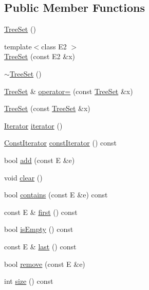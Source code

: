\subsection*{Public Member Functions}
\begin{DoxyCompactItemize}
\item 
\hyperlink{class_tree_set_a63b26923cbe71d1d8510122122db3d1a}{TreeSet} ()
\item 
{\footnotesize template$<$class E2 $>$ }\\\hyperlink{class_tree_set_ac4f90bbe6be9124628602a8051cc1bf7}{TreeSet} (const E2 \&x)
\item 
\hyperlink{class_tree_set_adfb73164a45aaf261ce5417ff43133de}{$\sim$TreeSet} ()
\item 
\hyperlink{class_tree_set}{TreeSet} \& \hyperlink{class_tree_set_a62c2c924979ed32bb18fad84f951ac92}{operator=} (const \hyperlink{class_tree_set}{TreeSet} \&x)
\item 
\hyperlink{class_tree_set_a1cb7531ae5e2e1258d7ee1bdc8e17059}{TreeSet} (const \hyperlink{class_tree_set}{TreeSet} \&x)
\item 
\hyperlink{class_tree_set_1_1_iterator}{Iterator} \hyperlink{class_tree_set_a4b22eab02d8d0600c305c29d63f3f7b8}{iterator} ()
\item 
\hyperlink{class_tree_set_1_1_const_iterator}{ConstIterator} \hyperlink{class_tree_set_a058de9aabb37e4263cc015365cadfc32}{constIterator} () const 
\item 
bool \hyperlink{class_tree_set_a3f311b68d64e3f630ef80eeca5dead7b}{add} (const E \&e)
\item 
void \hyperlink{class_tree_set_ae7b265d0ef49ecdfb4da1cfdd83b8778}{clear} ()
\item 
bool \hyperlink{class_tree_set_ab049cee0c63f84b93f5a81b338466909}{contains} (const E \&e) const 
\item 
const E \& \hyperlink{class_tree_set_a22dd96a543c903dd9b88b0b6d4cd92c6}{first} () const 
\item 
bool \hyperlink{class_tree_set_a7b70bc121f66750395cdae672cd1b084}{isEmpty} () const 
\item 
const E \& \hyperlink{class_tree_set_aa3eb29e936ae87a7f97c0d0dd4ec86a3}{last} () const 
\item 
bool \hyperlink{class_tree_set_aa76016b3ebd8868809812a3f2bd88b9e}{remove} (const E \&e)
\item 
int \hyperlink{class_tree_set_a8d184163dd000468de54110fc0999785}{size} () const 
\end{DoxyCompactItemize}


